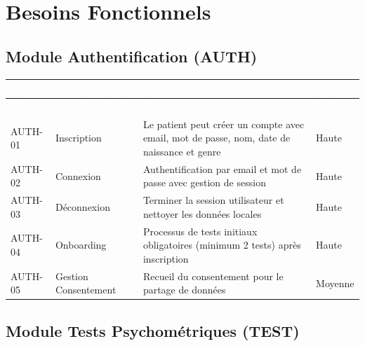 \documentclass[12pt,a4paper]{report}
\begin{document}
\section{Besoins Fonctionnels}

\subsection{Module Authentification (AUTH)}

\begin{longtable}{|p{2cm}|p{4cm}|p{7cm}|p{1.5cm}|}
    \hline
    \rowcolor{emsiblue}\textcolor{white}{\textbf{ID}} & \textcolor{white}{\textbf{Fonctionnalité}} & \textcolor{white}{\textbf{Description}} & \textcolor{white}{\textbf{Priorité}} \\
    \hline
    \endfirsthead
    \hline
    \rowcolor{emsiblue}\textcolor{white}{\textbf{ID}} & \textcolor{white}{\textbf{Fonctionnalité}} & \textcolor{white}{\textbf{Description}} & \textcolor{white}{\textbf{Priorité}} \\
    \hline
    \endhead
    
    AUTH-01 & Inscription & Le patient peut créer un compte avec email, mot de passe, nom, date de naissance et genre & Haute \\
    \hline
    AUTH-02 & Connexion & Authentification par email et mot de passe avec gestion de session & Haute \\
    \hline
    AUTH-03 & Déconnexion & Terminer la session utilisateur et nettoyer les données locales & Haute \\
    \hline
    AUTH-04 & Onboarding & Processus de tests initiaux obligatoires (minimum 2 tests) après inscription & Haute \\
    \hline
    AUTH-05 & Gestion Consentement & Recueil du consentement pour le partage de données & Moyenne \\
    \hline
\end{longtable}

\subsection{Module Tests Psychométriques (TEST)}
\end{document}
